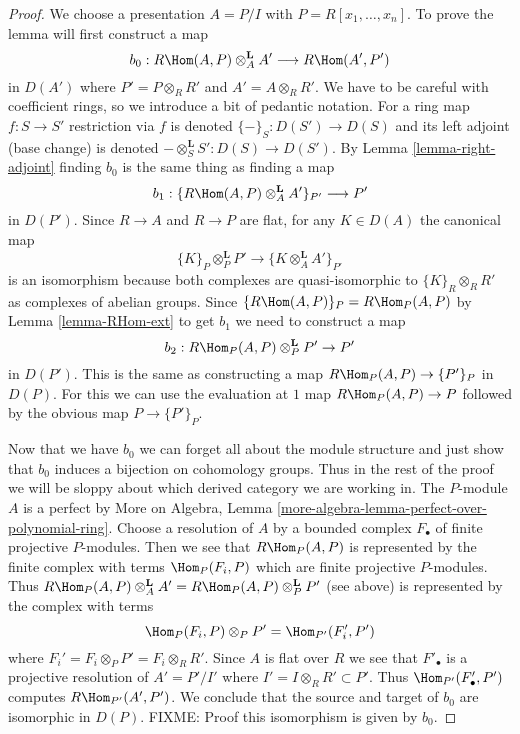 \begin{proof}
We choose a presentation $A = P/I$ with $P = R[x_1, \ldots, x_n]$.
To prove the lemma will first construct a map
$$
b_0 :
R\Hom(A, P) \otimes_A^\mathbf{L} A'
\longrightarrow
R\Hom(A', P')
$$
in $D(A')$ where $P' = P \otimes_R R'$ and $A' = A \otimes_R R'$.
We have to be careful with coefficient rings, so we introduce
a bit of pedantic notation. For a ring map $f : S \to S'$
restriction via $f$ is denoted $\{ - \}_S : D(S') \to D(S)$ and its
left adjoint (base change) is denoted
$- \otimes_S^\mathbf{L} S' : D(S) \to D(S')$.
By Lemma \ref{lemma-right-adjoint} finding $b_0$ is the same thing
as finding a map
$$
b_1 : \{R\Hom(A, P) \otimes_A^\mathbf{L} A'\}_{P'} \longrightarrow P'
$$
in $D(P')$. Since $R \to A$ and $R \to P$ are flat,
for any $K \in D(A)$ the canonical map
$$
\{K\}_P \otimes_P^\mathbf{L} P'
\longrightarrow
\{K \otimes_A^\mathbf{L} A'\}_{P'}
$$
is an isomorphism because both complexes are quasi-isomorphic
to $\{K\}_R \otimes_R R'$ as complexes of abelian groups.
Since $\{R\Hom(A, P)\}_P = R\Hom_P(A, P)$ by
Lemma \ref{lemma-RHom-ext}
to get $b_1$ we need to construct a map
$$
b_2 : R\Hom_P(A, P) \otimes_P^\mathbf{L} P' \to P'
$$
in $D(P')$. This is the same as constructing a map
$R\Hom_P(A, P) \to \{P'\}_P$ in $D(P)$. For this we can use
the evaluation at $1$ map $R\Hom_P(A, P) \to P$ followed
by the obvious map $P \to \{P'\}_P$.

\medskip\noindent
Now that we have $b_0$ we can forget all about the module structure
and just show that $b_0$ induces a bijection on cohomology groups.
Thus in the rest of the proof we will be sloppy about which derived
category we are working in. The $P$-module $A$ is a perfect by
More on Algebra, Lemma \ref{more-algebra-lemma-perfect-over-polynomial-ring}.
Choose a resolution of $A$ by a bounded complex $F_\bullet$ of
finite projective $P$-modules. Then we see that $R\Hom_P(A, P)$ is represented
by the finite complex with terms $\Hom_P(F_i, P)$ which are finite
projective $P$-modules. Thus
$R\Hom_P(A, P) \otimes_A^\mathbf{L} A' =
R\Hom_P(A, P) \otimes_P^\mathbf{L} P'$ (see above)
is represented by the complex with terms
$$
\Hom_P(F_i, P) \otimes_P P' = \Hom_{P'}(F_i', P')
$$
where $F_i' = F_i \otimes_P P' = F_i \otimes_R R'$. Since
$A$ is flat over $R$ we see that $F'_\bullet$ is a projective resolution
of $A' = P'/I'$ where $I' = I \otimes_R R' \subset P'$.
Thus $\Hom_{P'}(F'_\bullet, P')$ computes $R\Hom_{P'}(A', P')$.
We conclude that the source and target of $b_0$ are
isomorphic in $D(P)$.
FIXME: Proof this isomorphism is given by $b_0$.
\end{proof}

